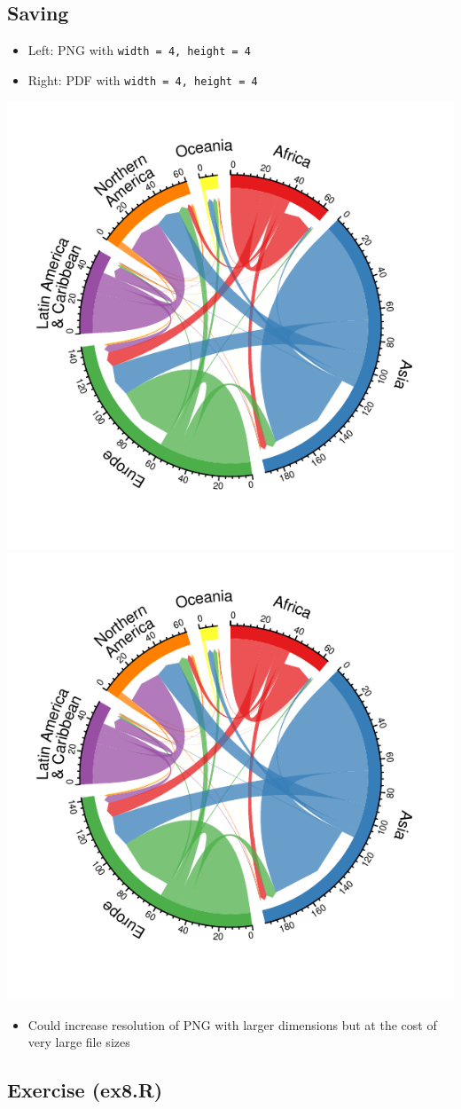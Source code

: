 \documentclass[
]{book}
\providecommand{\tightlist}{%
  \setlength{\itemsep}{0pt}\setlength{\parskip}{0pt}}
\begin{document}
\hypertarget{saving-1}{%
\subsection{Saving}\label{saving-1}}

\begin{itemize}
\tightlist
\item
  Left: PNG with \texttt{width\ =\ 4,\ height\ =\ 4}
\item
  Right: PDF with \texttt{width\ =\ 4,\ height\ =\ 4}
\end{itemize}

\includegraphics[width=0.45\linewidth]{plot/un_stock_2019}
\includegraphics[width=0.45\linewidth]{plot/un_stock_2019}

\begin{itemize}
\tightlist
\item
  Could increase resolution of PNG with larger dimensions but at the cost of very large file sizes
\end{itemize}

\hypertarget{exercise-ex8.r}{%
\subsection{Exercise (ex8.R)}\label{exercise-ex8.r}}
\end{document}
